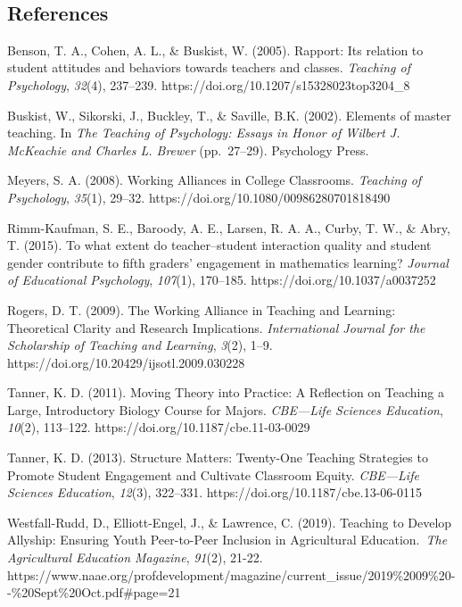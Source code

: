 \documentclass{book}
\begin{document}
~ ~

\hypertarget{references}{%
\subsection{References}\label{references}}

Benson, T. A., Cohen, A. L., \& Buskist, W. (2005). Rapport: Its relation to
student attitudes and behaviors towards teachers and classes. \emph{Teaching
of Psychology}, \emph{32}(4), 237--239.
https://doi.org/10.1207/s15328023top3204\_8

Buskist, W., Sikorski, J., Buckley, T., \& Saville, B.K. (2002). Elements of
master teaching. In \emph{The Teaching of Psychology: Essays in Honor of
Wilbert J. McKeachie and Charles L. Brewer} (pp.~27--29). Psychology Press.

Meyers, S. A. (2008). Working Alliances in College Classrooms. \emph{Teaching
of Psychology}, \emph{35}(1), 29--32.
https://doi.org/10.1080/00986280701818490

Rimm-Kaufman, S. E., Baroody, A. E., Larsen, R. A. A., Curby, T. W., \& Abry,
T. (2015). To what extent do teacher--student interaction quality and student
gender contribute to fifth graders' engagement in mathematics learning?
\emph{Journal of Educational Psychology}, \emph{107}(1), 170--185.
https://doi.org/10.1037/a0037252

Rogers, D. T. (2009). The Working Alliance in Teaching and Learning:
Theoretical Clarity and Research Implications. \emph{International Journal for
the Scholarship of Teaching and Learning}, \emph{3}(2), 1--9.
https://doi.org/10.20429/ijsotl.2009.030228

Tanner, K. D. (2011). Moving Theory into Practice: A Reflection on Teaching a
Large, Introductory Biology Course for Majors. \emph{CBE---Life Sciences
Education}, \emph{10}(2), 113--122. https://doi.org/10.1187/cbe.11-03-0029

Tanner, K. D. (2013). Structure Matters: Twenty-One Teaching Strategies to
Promote Student Engagement and Cultivate Classroom Equity. \emph{CBE---Life
Sciences Education}, \emph{12}(3), 322--331.
https://doi.org/10.1187/cbe.13-06-0115

Westfall-Rudd, D., Elliott-Engel, J., \& Lawrence, C. (2019). Teaching to
Develop Allyship: Ensuring Youth Peer-to-Peer Inclusion in Agricultural
Education.~\emph{The Agricultural Education Magazine}, \emph{91}(2), 21-22.
https://www.naae.org/profdevelopment/magazine/current\_issue/2019\%2009\%20-\/-\%20Sept\%20Oct.pdf\#page=21
\end{document}
